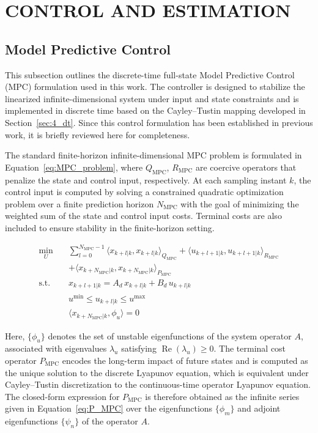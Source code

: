 \section{CONTROL AND ESTIMATION} \label{sec:control}

\subsection{Model Predictive Control} \label{sec:mpc}

This subsection outlines the discrete-time full-state Model Predictive Control (MPC) formulation used in this work. The controller is designed to stabilize the linearized infinite-dimensional system under input and state constraints and is implemented in discrete time based on the Cayley--Tustin mapping developed in Section~\ref{sec:4_dt}. Since this control formulation has been established in previous work\autocite{Moadeli2025Model}, it is briefly reviewed here for completeness.

The standard finite-horizon infinite-dimensional MPC problem is formulated in Equation~\ref{eq:MPC_problem}, where $Q_{\mathrm{MPC}}$, $R_{\mathrm{MPC}}$ are coercive operators that penalize the state and control input, respectively. At each sampling instant $k$, the control input is computed by solving a constrained quadratic optimization problem over a finite prediction horizon $N_{\mathrm{MPC}}$ with the goal of minimizing the weighted sum of the state and control input costs. Terminal costs are also included to ensure stability in the finite-horizon setting.

\begin{equation} \label{eq:MPC_problem}
\begin{aligned}
\min_{U} \quad & \sum_{l=0}^{N_{\mathrm{MPC}} - 1} \langle x_{k+l|k}, x_{k+l|k} \rangle_{Q_{\mathrm{MPC}}} + \langle u_{k+l+1|k}, u_{k+l+1|k} \rangle_{R_{\mathrm{MPC}}} \\
&+ \langle x_{k+N_{\mathrm{MPC}}|k}, x_{k+N_{\mathrm{MPC}}|k} \rangle_{P_{\mathrm{MPC}}} \\
\text{s.t.} \quad & x_{k+l+1|k} = A_d\, x_{k+l|k} + B_d\, u_{k+l|k} \\
& u^{\min} \leq u_{k+l|k} \leq u^{\max} \\
& \langle x_{k+N_{\mathrm{MPC}}|k}, \phi_u \rangle = 0
\end{aligned}
\end{equation}

Here, $\{\phi_u\}$ denotes the set of unstable eigenfunctions of the system operator $A$, associated with eigenvalues $\lambda_u$ satisfying $\operatorname{Re}(\lambda_u) \geq 0$. The terminal cost operator $P_{\mathrm{MPC}}$ encodes the long-term impact of future states and is computed as the unique solution to the discrete Lyapunov equation, which is equivalent under Cayley--Tustin discretization to the continuous-time operator Lyapunov equation\autocite{Curtain2020Introduction,Khatibi2021Model}. The closed-form expression for $P_{\mathrm{MPC}}$ is therefore obtained as the infinite series given in Equation~\ref{eq:P_MPC} over the eigenfunctions $\{\phi_m\}$ and adjoint eigenfunctions $\{\psi_n\}$ of the operator $A$.

